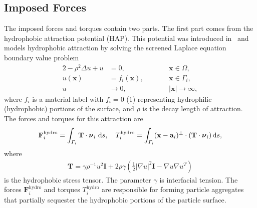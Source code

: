 \documentclass[lineno]{jfm}
\renewcommand{\aa}{\mathbf{a}}
\newcommand{\FF}{\mathbf{F}}
\newcommand{\nnu}{\boldsymbol{\nu}}
\newcommand{\xx}{\mathbf{x}}
\begin{document}
\subsection{Imposed Forces}
The imposed forces and torques contain two parts. The first part comes
from the hydrophobic attraction potential (HAP). This potential was
introduced in~\cite{Fu20} and models hydrophobic attraction by solving
the screened Laplace equation boundary value problem
\begin{alignat}{2}
  \label{SL}
-\rho^2 \Delta u + u &=0,            && \xx \in \Omega,\\
\label{SLbc}
u(\xx) &= f_i(\xx),\qquad  && \xx \in \Gamma_i, \\
\label{SLff}
u &\to 0,                          &&|\xx| \to \infty,
\end{alignat}
where $f_i$ is a material label with $f_i = 0$ ($1$) representing
hydrophilic (hydrophobic) portions of the surface, and $\rho$ is the
decay length of attraction. The forces and torques for this attraction
are 
\begin{align}
  \label{eqn:hydrophobicAttraction}
  \FF_i^{\text{hydro}} = \int_{\Gamma_i} {\bf T}\cdot \nnu_i \, \dif s, 
    \quad 
  T_i^{\text{hydro}} = \int_{\Gamma_i} (\xx - \aa_i)^{\perp} \cdot ({\bf T} \cdot \nnu_i) \dif s,
\end{align}
where
\begin{align}
  \label{eq:stress}
\mathbf{T}
= \gamma\rho^{-1}u^2 \mathbf{I} + 2\rho\gamma \left(\tfrac{1}{2}|\nabla
  u|^2 \mathbf{I} - \nabla u  \nabla u^T\right)
\end{align}
is the hydrophobic stress tensor. The parameter $\gamma$ is interfacial
tension. The forces $\FF_i^{\text{hydro}}$ and torques
$T_i^{\text{hydro}}$ are responsible for forming particle aggregates
that partially sequester the hydrophobic portions of the particle
surface.
\end{document}
